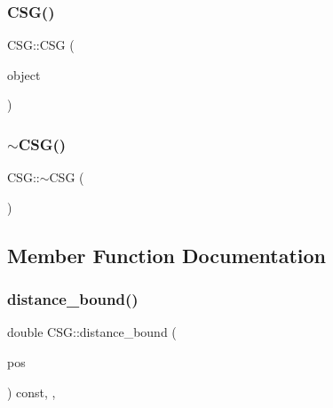 \mbox{\label{classCSG_a93e83c940758238fc7b188555b5a3787}} 
\subsubsection{\texorpdfstring{CSG()}{CSG()}\hspace{0.1cm}{\footnotesize\ttfamily [3/3]}}
{\footnotesize\ttfamily C\+S\+G\+::\+C\+SG (\begin{DoxyParamCaption}\item[{\mbox{\hyperlink{classSDFObject}{S\+D\+F\+Object}} $\ast$}]{object }\end{DoxyParamCaption})\hspace{0.3cm}{\ttfamily [explicit]}}

\mbox{\label{classCSG_a37f03d2821dec9ee614ec6407758ba17}} 
\subsubsection{\texorpdfstring{$\sim$CSG()}{~CSG()}}
{\footnotesize\ttfamily C\+S\+G\+::$\sim$\+C\+SG (\begin{DoxyParamCaption}{ }\end{DoxyParamCaption})\hspace{0.3cm}{\ttfamily [override]}}



\subsection{Member Function Documentation}
\mbox{\label{classCSG_a7dc0853ae99ffd54ea99eccdc5fd5acf}} 
\subsubsection{\texorpdfstring{distance\_bound()}{distance\_bound()}}
{\footnotesize\ttfamily double C\+S\+G\+::distance\+\_\+bound (\begin{DoxyParamCaption}\item[{const \mbox{\hyperlink{classVector3D}{Vector3D}} \&}]{pos }\end{DoxyParamCaption}) const\hspace{0.3cm}{\ttfamily [override]}, {\ttfamily [private]}, {\ttfamily [virtual]}}



